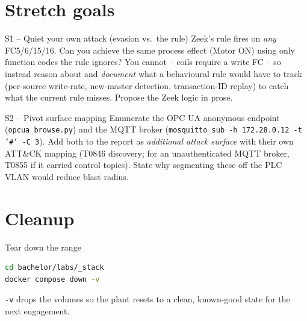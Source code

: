 \documentclass[11pt,a4paper]{article}
\begin{document}
\section*{Stretch goals}

\begin{stepbox}{S1 -- Quiet your own attack (evasion vs.\ the rule)}
Zeek's rule fires on \emph{any} FC5/6/15/16. Can you achieve the same
process effect (Motor ON) using only function codes the rule ignores?
You cannot -- coils require a write FC -- so instead reason about and
\emph{document} what a behavioural rule would have to track (per-source
write-rate, new-master detection, transaction-ID replay) to catch what
the current rule misses. Propose the Zeek logic in prose.
\end{stepbox}

\begin{stepbox}{S2 -- Pivot surface mapping}
Enumerate the OPC UA anonymous endpoint (\texttt{opcua\_browse.py}) and
the MQTT broker (\texttt{mosquitto\_sub -h 172.28.0.12 -t '\#' -C 3}).
Add both to the report as \emph{additional attack surface} with their
own ATT\&CK mapping (T0846 discovery; for an unauthenticated MQTT
broker, T0855 if it carried control topics). State why segmenting these
off the PLC VLAN would reduce blast radius.
\end{stepbox}

\section*{Cleanup}

\begin{stepbox}{Tear down the range}
\begin{lstlisting}[language=bash]
cd bachelor/labs/_stack
docker compose down -v
\end{lstlisting}
\texttt{-v} drops the volumes so the plant resets to a clean,
known-good state for the next engagement.
\end{stepbox}
\end{document}
